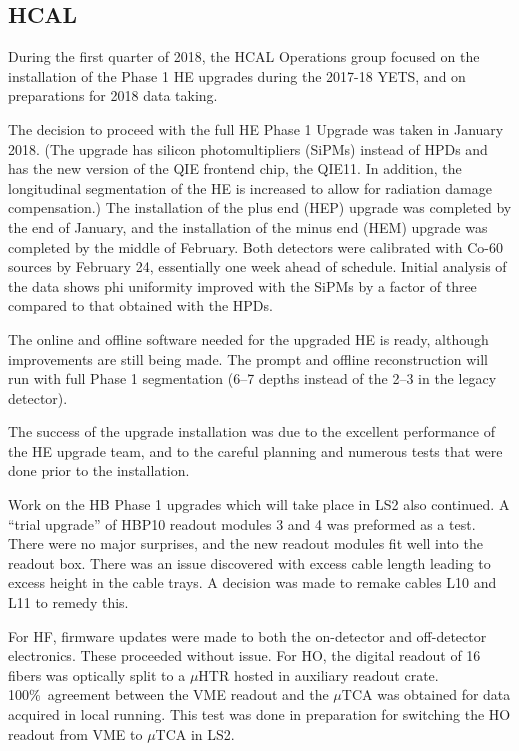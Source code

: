 \documentclass[12pt]{article}
\begin{document}
\subsection{HCAL}

During the first quarter of 2018, the HCAL Operations group focused on the installation of the Phase 1 HE upgrades during the 2017-18 YETS, and on preparations for 2018 data taking.



The decision to proceed with the full HE Phase 1 Upgrade was taken in January 2018. 
(The upgrade has silicon photomultipliers (SiPMs) instead of HPDs and has the new version of
the QIE frontend chip, the QIE11. In addition, the longitudinal segmentation of the HE is increased
to allow for radiation damage compensation.)
The installation of the
plus end (HEP) upgrade was completed by the end of January, and the installation of the minus end (HEM) 
upgrade was completed by the middle of February. Both detectors were calibrated with Co-60 sources
by February 24, essentially one week ahead of schedule. Initial analysis of the data shows phi uniformity improved
with the SiPMs by a factor of three compared to that obtained with the HPDs. 

The online and offline software needed for the upgraded HE is ready, although improvements are still
being made. The prompt and offline reconstruction will run with full Phase 1 segmentation (6--7 depths 
instead of the 2--3 in the legacy detector).

The success of the upgrade installation was due to the excellent performance of the HE upgrade team,
and to the careful planning and numerous tests that were done prior to the installation.




Work on the HB Phase 1 upgrades which will take place in LS2 also continued.
A “trial upgrade” of HBP10 readout modules 3 and 4 was preformed as a test.
There were no major surprises, and the new readout modules fit well into the readout box.
There was an issue discovered with excess cable length leading to excess height in the cable trays.
A decision was made to remake cables L10 and L11 to remedy this.



For HF, firmware updates were made to both the
on-detector and off-detector electronics. These proceeded without issue.
For HO, the digital readout of 16 fibers was optically split to a $\mu$HTR hosted in
auxiliary readout crate. 100\%\ agreement between the VME readout and the $\mu$TCA 
was obtained for data acquired in local running.
This test was done in preparation for switching the HO readout from VME to $\mu$TCA in LS2.
\end{document}
